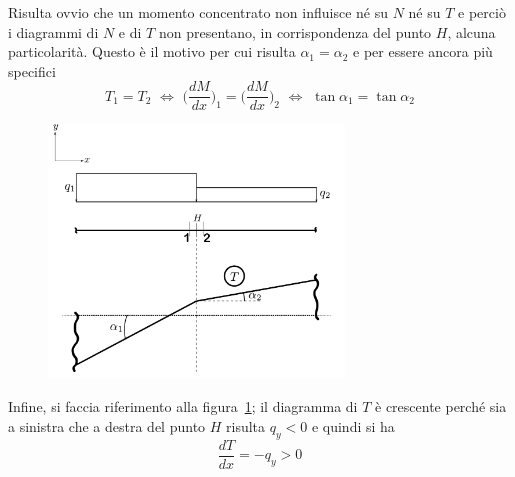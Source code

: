 \noindent Risulta ovvio che un momento concentrato non influisce né su $N$ né su $T$ e perciò i diagrammi di $N$ e di $T$ non presentano, in corrispondenza del punto $H$, alcuna particolarità. Questo è il motivo per cui risulta $\alpha_{1} = \alpha_{2}$ e per essere ancora più specifici
\begin{equation*}
T_{1} = T_{2} \,\, \iff \,\, \biggl( \frac{dM}{dx} \biggr)_{1} =  \biggl( \frac{dM}{dx} \biggr)_{2} \,\, \iff \,\, \tan \alpha_{1} = \tan \alpha_{2}
\end{equation*}
\renewcommand{\thefigure}{13~-~4}
\begin{figure}[ht]
\centering
\includegraphics[width=0.7\textwidth]{Immagini/Parte_13/Figura13_4/figura13_4.pdf}
\caption{}
\label{figura13-4}
\end{figure}
Infine, si faccia riferimento alla figura~\ref{figura13-4}; il diagramma di $T$ è crescente perché sia a sinistra che a destra del punto $H$ risulta $q_{y} < 0$ e quindi si ha 
\begin{equation*}
\frac{dT}{dx} = - q_{y} > 0 
\end{equation*}
